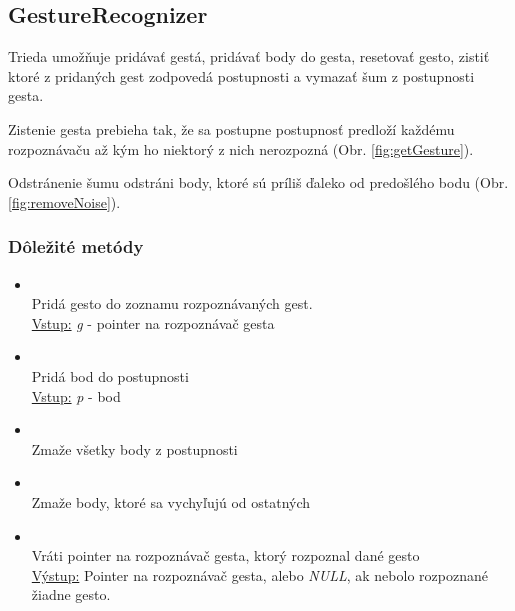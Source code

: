 \subsection{GestureRecognizer}

Trieda umožňuje pridávať gestá, pridávať body do gesta, resetovať gesto, zistiť ktoré z pridaných gest zodpovedá postupnosti a vymazať šum z postupnosti gesta.

Zistenie gesta prebieha tak, že sa postupne postupnosť predloží každému rozpoznávaču až kým ho niektorý z nich nerozpozná (Obr. \ref{fig:getGesture}).

Odstránenie šumu odstráni body, ktoré sú príliš ďaleko od predošlého bodu (Obr. \ref{fig:removeNoise}). 

\subsubsection{Dôležité metódy}
\begin{itemize}
\item {}
\\Pridá gesto do zoznamu rozpoznávaných gest.
\\ \underline{Vstup:} \textit{g} - pointer na rozpoznávač gesta
\item {}
\\Pridá bod do postupnosti
\\ \underline{Vstup:} \textit{p} - bod
\item {}
\\Zmaže všetky body z postupnosti
\item {}
\\Zmaže body, ktoré sa vychyľujú od ostatných
\item {}
\\Vráti pointer na rozpoznávač gesta, ktorý rozpoznal dané gesto
\\ \underline{Výstup:} Pointer na rozpoznávač gesta, alebo \textit{NULL}, ak nebolo rozpoznané žiadne gesto.
\end{itemize}

